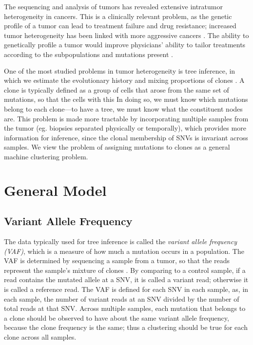 \documentclass[11pt]{article}
\begin{document}
The sequencing and analysis of tumors has revealed extensive intratumor heterogeneity in cancers. This is a clinically relevant problem, as the genetic profile of a tumor can lead to treatment failure and drug resistance; increased tumor heterogeneity has been linked with more aggressive cancers \cite{Gerlinger2012}. The ability to genetically profile a tumor would improve physicians' ability to tailor treatments according to the subpopulations and mutations present \cite{Raphael2014}. 

One of the most studied problems in tumor heterogeneity is tree inference, in which we estimate the evolutionary history and mixing proportions of clones \cite{Ancestree}. A clone is typically defined as a group of cells that arose from the same set of mutations, so that the cells with this  In doing so, we must know which mutations belong to each clone---to have a tree, we must know what the constituent nodes are. This problem is made more tractable by incorporating multiple samples from the tumor (eg. biopsies separated physically or temporally), which provides more information for inference, since the clonal membership of SNVs is invariant across samples. We view the problem of assigning mutations to clones as a general machine clustering problem.

\section{General Model}
\subsection{Variant Allele Frequency}
The data typically used for tree inference is called the \emph{variant allele frequency (VAF)}, which is a measure of how much a mutation occurs in a population. The VAF is determined by sequencing a sample from a tumor, so that the reads represent the sample's mixture of clones \cite{Ding2012}. By comparing to a control sample, if a read contains the mutated allele at a SNV, it is called a variant read; otherwise it is called a reference read. The VAF is defined for each SNV in each sample, as, in each sample, the number of variant reads at an SNV divided by the number of total reads at that SNV. Across multiple samples, each mutation that belongs to a clone should be observed to have about the same variant allele frequency, because the clone frequency is the same; thus a clustering should be true for each clone across all samples.
\end{document}
